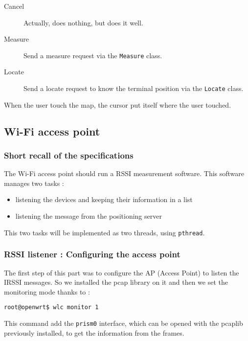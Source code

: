 \begin{description}
    \item[Cancel] Actually, does nothing, but does it well.
    \item[Measure] Send a measure request via the \verb+Measure+ class.
    \item[Locate] Send a locate request to know the terminal position via the
        \verb+Locate+ class.
\end{description}

When the user touch the map, the cursor put itself where the user touched.

\subsection{Wi-Fi access point}

\subsubsection{Short recall of the specifications}

The Wi-Fi access point should run a RSSI measurement software. This software
manages two tasks :

\begin{itemize}
    \item listening the devices and keeping their information in a list
    \item listening the message from the positioning server
\end{itemize}

This two tasks will be implemented as two threads, using \verb+pthread+.

\subsubsection{RSSI listener : Configuring the access point}

The first step of this part was to configure the AP (Access Point) to listen
the IRSSI messages. So we installed the pcap library on it and then we set the
monitoring mode thanks to :

\begin{verbatim}
root@openwrt$ wlc monitor 1
\end{verbatim}

This command add the \verb+prism0+ interface, which can be opened with the
pcaplib previously installed, to get the information from the frames.

